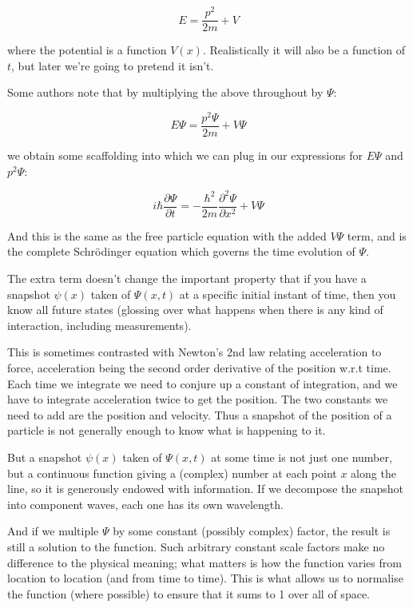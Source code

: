 $$
E = \frac{p^2}{2m} + V
$$

where the potential is a function $V(x)$. Realistically it will also be a function of $t$, but later we're going to pretend it isn't.

Some authors note that by multiplying the above throughout by $\Psi$:

$$
E\Psi = \frac{p^2{\Psi}}{2m} + V{\Psi}
$$

we obtain some scaffolding into which we can plug in our expressions for $E \Psi$ and $p^2 \Psi$:

\begin{equation}
i\hbar \frac{\partial \Psi}{\partial t}
=
- \frac{\hbar^2}{2m} \frac{\partial^2 \Psi}{\partial x^2}
+ V{\Psi}
\label{eqn:se}
\end{equation}

And this is the same as the free particle equation with the added $V\Psi$ term, and is the complete Schrödinger equation which governs the time evolution of $\Psi$.

The extra term doesn't change the important property that if you have a snapshot $\psi(x)$ taken of $\Psi(x, t)$ at a specific initial instant of time, then you know all future states (glossing over what happens when there is any kind of interaction, including measurements).

This is sometimes contrasted with Newton's 2nd law relating acceleration to force, acceleration being the second order derivative of the position w.r.t time. Each time we integrate we need to conjure up a constant of integration, and we have to integrate acceleration twice to get the position. The two constants we need to add are the position and velocity. Thus a snapshot of the position of a particle is not generally enough to know what is happening to it.

But a snapshot $\psi(x)$ taken of $\Psi(x, t)$ at some time is not just one number, but a continuous function giving a (complex) number at each point $x$ along the line, so it is generously endowed with information. If we decompose the snapshot into component waves, each one has its own wavelength.

And if we multiple $\Psi$ by some constant (possibly complex) factor, the result is still a solution to the function. Such arbitrary constant scale factors make no difference to the physical meaning; what matters is how the function varies from location to location (and from time to time). This is what allows us to normalise the function (where possible) to ensure that it sums to 1 over all of space.

